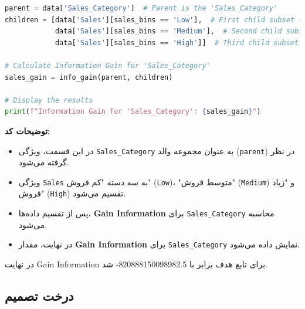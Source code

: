 \documentclass{article}
\begin{document}
\begin{lstlisting}[language=Python]
parent = data['Sales_Category']  # Parent is the 'Sales_Category'
children = [data['Sales'][sales_bins == 'Low'],  # First child subset (Low)
            data['Sales'][sales_bins == 'Medium'],  # Second child subset (Medium)
            data['Sales'][sales_bins == 'High']]  # Third child subset (High)

# Calculate Information Gain for 'Sales_Category'
sales_gain = info_gain(parent, children)

# Display the results
print(f"Information Gain for 'Sales_Category': {sales_gain}")
\end{lstlisting}

\textbf{توضیحات کد:}

\begin{itemize}
    \item در این قسمت، ویژگی \texttt{Sales\_Category} به عنوان مجموعه والد (\texttt{parent}) در نظر گرفته می‌شود.
    \item ویژگی \texttt{Sales} به سه دسته "کم فروش" (\texttt{Low})، "متوسط فروش" (\texttt{Medium}) و "زیاد فروش" (\texttt{High}) تقسیم می‌شود.
    \item پس از تقسیم داده‌ها، \textbf{Gain Information} برای \texttt{Sales\_Category} محاسبه می‌شود.
    \item در نهایت، مقدار \textbf{Gain Information} برای \texttt{Sales\_Category} نمایش داده می‌شود.
\end{itemize}

در نهایت Gain Information برای تابع هدف برابر با 820888150098982.5- شد.

\subsection{درخت تصمیم}
\end{document}
